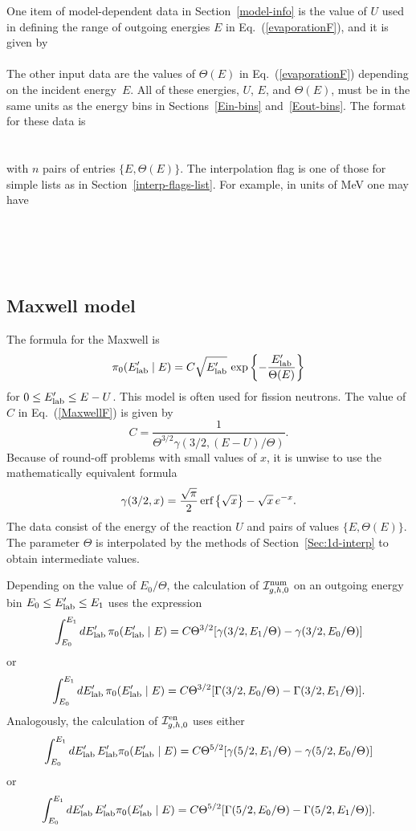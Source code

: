 One item of model-dependent data in Section~\ref{model-info}
is the value of $U$ used in defining the range of outgoing
energies $E$ in Eq.~(\ref{evaporationF}), and it is given by\\
  \\
The other input data are the values of $\Theta(E)$ in
Eq.~(\ref{evaporationF}) depending on the incident energy~$E$.  
All of these energies, $U$, $E$, and $\Theta(E)$, must be in the same
units as the energy bins in Sections~\ref{Ein-bins} and~\ref{Eout-bins}.
The format for these data is\\
  \\
  \\
with $n$ pairs of entries $\{E, \Theta(E)\}$.  
The interpolation flag is one of those for simple lists as in 
Section~\ref{interp-flags-list}.
For example, in units of MeV one may have\\
  \\
  \\
  \\
  \\

\subsection{Maxwell model}
The formula for the Maxwell is
\begin{equation}
  \pi_0(E_{\text{lab}}'  \mid E) = C \sqrt{E_{\text{lab}}' } \, \exp\left\{- \frac{E_{\text{lab}}' }{\Theta(E)}\right\}
 \label{MaxwellF}
\end{equation}
for $0 \le E_{\text{lab}}'  \le E - U$.  This model is often used for fission neutrons.
The value of $C$ in Eq.~(\ref{MaxwellF}) is given by
$$
  C = \frac{1}{\Theta^{3/2} \gamma(3/2, (E - U)/\Theta)}.
$$
Because of round-off problems with small values of $x$,
it is unwise to use the mathematically equivalent formula
$$
  \gamma(3/2, x) =
  \frac{\sqrt{\pi}}{2}\, \text{erf}\left\{\sqrt{x}\right\} - \sqrt{x}\,e^{-x}.
$$
The data consist of the energy of the reaction $U$ and pairs of
values $\{E, \Theta(E)\}$.  The parameter $\Theta$ is interpolated
by the methods of Section~\ref{Sec:1d-interp} to obtain intermediate values. 

Depending on the value of $E_0/\Theta$,
the calculation of ${\cal I}^{\text{num}}_{g,h,0}$ on an outgoing energy bin
$E_0 \le E_{\text{lab}}'  \le E_1$ uses the expression
$$
  \int_{E_0}^{E_1} dE_{\text{lab}}'  \, \pi_0(E_{\text{lab}}'  \mid E) =
   C\Theta^{3/2}[\gamma({3/2}, E_1/\Theta) - \gamma({3/2}, E_0/\Theta)]
$$
or
$$
  \int_{E_0}^{E_1} dE_{\text{lab}}'  \, \pi_0(E_{\text{lab}}'  \mid E) =
   C\Theta^{3/2}[\Gamma({3/2}, E_0/\Theta) - \Gamma({3/2}, E_1/\Theta)].
$$
Analogously, the calculation of ${\cal I}^{\text{en}}_{g,h,0}$ uses either
$$
  \int_{E_0}^{E_1} dE_{\text{lab}}'  \, E_{\text{lab}}' \pi_0(E_{\text{lab}}'  \mid E) =
   C\Theta^{5/2}[\gamma({5/2}, E_1/\Theta) - \gamma({5/2}, E_0/\Theta)]
$$
or
$$
  \int_{E_0}^{E_1} dE_{\text{lab}}'  \, E_{\text{lab}}' \pi_0(E_{\text{lab}}'  \mid E) =
   C\Theta^{5/2}[\Gamma({5/2}, E_0/\Theta) - \Gamma({5/2}, E_1/\Theta)].
$$

